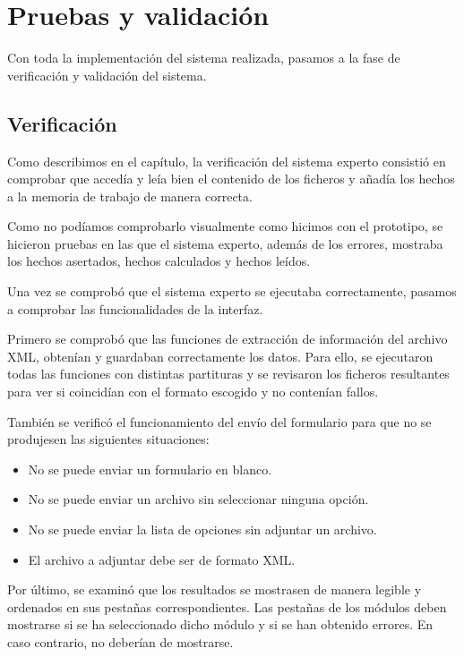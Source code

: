 \chapter{Pruebas y validación}

Con toda la implementación del sistema realizada, pasamos a la fase de verificación y validación del sistema. 

\section{Verificación}

Como describimos en el capítulo, la verificación del sistema experto consistió en comprobar que accedía y leía bien el contenido de los ficheros y añadía los hechos a la memoria de trabajo de manera correcta. 

Como no podíamos comprobarlo visualmente como hicimos con el prototipo, se hicieron pruebas en las que el sistema experto, además de los errores, mostraba los hechos asertados, hechos calculados y hechos leídos. 

Una vez se comprobó que el sistema experto se ejecutaba correctamente, pasamos a comprobar las funcionalidades de la interfaz.

Primero se comprobó que las funciones de extracción de información del archivo XML, obtenían y guardaban correctamente los datos. Para ello, se ejecutaron todas las funciones con distintas partituras y se revisaron los ficheros resultantes para ver si coincidían con el formato escogido y no contenían fallos.

También se verificó el funcionamiento del envío del formulario para que no se produjesen las siguientes situaciones:

\begin{itemize}

	\item No se puede enviar un formulario en blanco.
	\item No se puede enviar un archivo sin seleccionar ninguna opción.
	\item No se puede enviar la lista de opciones sin adjuntar un archivo.
	\item El archivo a adjuntar debe ser de formato XML.

\end{itemize}

Por último, se examinó que los resultados se mostrasen de manera legible y ordenados en sus pestañas correspondientes. Las pestañas de los módulos deben mostrarse si se ha seleccionado dicho módulo y si se han obtenido errores. En caso contrario, no deberían de mostrarse.

